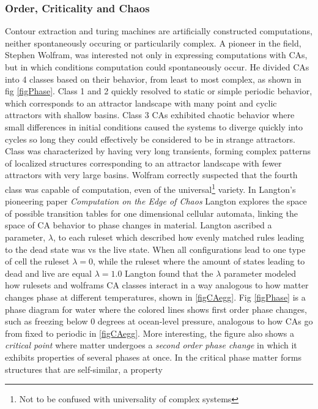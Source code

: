 \subsubsection{Order, Criticality and Chaos}
Contour extraction and turing machines are artificially constructed
computations, neither spontaneously occuring or particularily complex.
A pioneer in the field, Stephen Wolfram, was interested not only in expressing
computations with CAs, but in which conditions computation could spontaneously
occur.
He divided CAs into 4 classes based on their behavior, from least to most
complex, as shown in fig \ref{figPhase}.
Class 1 and 2 quickly resolved to static or simple periodic behavior, which
corresponds to an attractor landscape with many point and cyclic attractors with
shallow basins.
Class 3 CAs exhibited chaotic behavior where small differences in initial
conditions caused the systems to diverge quickly into cycles so long they could
effectively be considered to be in strange attractors.
Class was characterized by having very long transients, forming complex
patterns of localized structures corresponding to an attractor landscape with
fewer attractors with very large basins.
Wolfram correctly suspected that the fourth class was capable of computation,
even of the universal\footnote{Not to be confused with
  universality of complex systems} variety.
%
In Langton's pioneering paper \emph{Computation on the Edge of Chaos}
\cite{langton_computation_1990} Langton explores the space of possible
transition tables for one dimensional cellular automata, linking the space of CA
behavior to phase changes in material.
%
Langton ascribed a parameter, $\lambda$, to each ruleset which described how evenly
matched rules leading to the dead state was vs the live state.
When all configurations lead to one type of cell the ruleset $\lambda = 0$, while
the ruleset where the amount of states leading to dead and live are equal 
$\lambda = 1.0$
%
Langton found that the $\lambda$ parameter modeled how rulesets and wolframs CA
classes interact in a way analogous to how matter changes phase at different
temperatures, shown in \ref{figCAegg}.
%
Fig \ref{figPhase} is a phase diagram for water where the colored lines shows
first order phase changes, such as freezing below 0 degrees at ocean-level
pressure, analogous to how CAs go from fixed to periodic in \ref{figCAegg}.
%
More interesting, the figure also shows a \emph{critical point} where matter
undergoes a \emph{second order phase change} in which it exhibits properties of
several phases at once.
%
In the critical phase matter forms structures that are self-similar, a property
